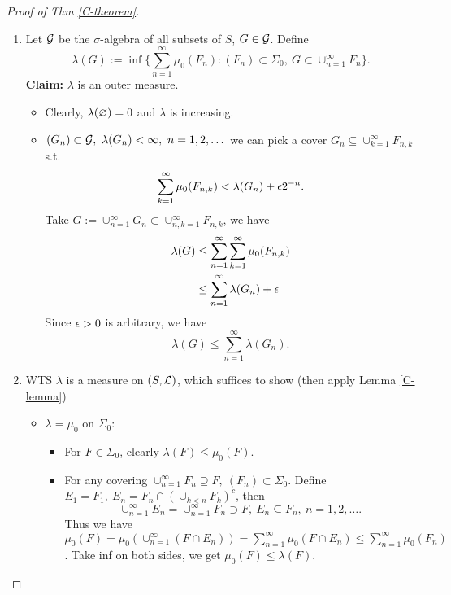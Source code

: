 \begin{proof}[Proof of Thm \ref{C-theorem}]\
\begin{enumerate}[label = (\alph*)]
    \item Let $\mathcal{G}$ be the $\sigma$-algebra
 of all subsets of $S$, $G \in \mathcal{G}$. Define 
 \begin{equation*}
     \lambda(G) := \inf \{\sum_{n = 1}^\infty \mu_0(F_n): (F_n) \subset \Sigma_0,\ G \subset \cup_{n=1}^\infty F_n\}.
 \end{equation*}
 \textbf{Claim:} \underline{$\lambda$ is an outer measure}.
 \begin{itemize}
     \item Clearly, $\lambda(\varnothing) = 0$ and $\lambda$ is increasing.
     \item $(G_n) \subset \mathcal{G},\ \lambda(G_n) < \infty,\ n=1,2,\dots$ we can pick a cover $G_n \subseteq \cup_{k = 1}^\infty F_{n,k}$ s.t. $$\sum_{k=1}^\infty \mu_0 (F_{n,k}) < \lambda (G_n) + \epsilon 2^{-n}.$$
     Take $G := \cup_{n=1}^\infty G_n \subset \cup_{n,k = 1}^\infty F_{n,k}$, we have
     \begin{align*}
         \lambda(G) &\leq \sum_{n = 1}^\infty \sum_{k = 1}^\infty \mu_0(F_{n,k})\\
         &\leq \sum_{n = 1}^\infty \lambda(G_n) + \epsilon
     \end{align*}
     Since $\epsilon > 0$ is arbitrary, we have
     \begin{equation*}
         \lambda(G) \leq \sum_{n = 1}^\infty \lambda(G_n).
     \end{equation*}
 \end{itemize}
 \item WTS $\lambda$ is a measure on $(S,\mathcal{L})$, which suffices to show (then apply Lemma \ref{C-lemma}) 
 \begin{itemize}
     \item $\lambda = \mu_0$ on $\Sigma_0$:
     \begin{itemize}
         \item  For $F \in \Sigma_0$, clearly $\lambda(F) \leq \mu_0(F)$. 
         \item For any covering $\cup_{n = 1}^\infty F_n \supseteq F,\ (F_n) \subset \Sigma_0$. Define $E_1 = F_1,\ E_n = F_n \cap (\cup_{k < n} F_k)^c$, then $$\cup_{n = 1}^\infty E_n = \cup_{n=1}^\infty F_n \supset F,\ E_n \subseteq F_n,\ n = 1,2,\dots.$$
         Thus we have $\mu_0 (F) = \mu_0(\cup_{n = 1}^\infty (F \cap E_n)) = \sum_{n = 1}^\infty \mu_0(F \cap E_n) \leq \sum_{n = 1}^\infty \mu_0 (F_n)$. Take inf on both sides, we get $\mu_0(F) \leq \lambda(F)$.
     \end{itemize}
     

\end{itemize}
\end{enumerate}
\end{proof}

